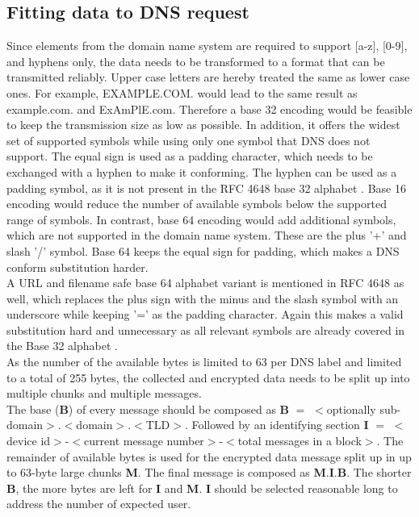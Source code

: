     \subsection{Fitting data to DNS request}
        \label{subsec:software_design:fitting}
        Since elements from the domain name system are required to support [a-z], [0-9], and hyphens only, the data needs to be transformed to a format that can be transmitted reliably. Upper case letters are hereby treated the same as lower case ones.
        For example, EXAMPLE.COM. would lead to the same result as example.com. and ExAmPlE.com.
        Therefore a base 32 encoding would be feasible to keep the transmission size as low as possible. In addition, it offers the widest set of supported symbols while using only one symbol that DNS does not support. The equal sign is used as a padding character, which needs to be exchanged with a hyphen to make it conforming. The hyphen can be used as a padding symbol, as it is not present in the RFC 4648 base 32 alphabet \cite{josefsson_simonjosefssonorg_base16_2006}. Base 16 encoding would reduce the number of available symbols below the supported range of symbols. In contrast, base 64 encoding would add additional symbols, which are not supported in the domain name system. These are the plus '+' and slash '/' symbol. Base 64 keeps the equal sign for padding, which makes a DNS conform substitution harder.\\
        A URL and filename safe base 64 alphabet variant is mentioned in RFC 4648 as well, which replaces the plus sign with the minus and the slash symbol with an underscore while keeping '=' as the padding character. Again this makes a valid substitution hard and unnecessary as all relevant symbols are already covered in the Base 32 alphabet \cite{josefsson_simonjosefssonorg_base16_2006}.\\
        
        As the number of the available bytes is limited to 63 per DNS label and limited to a total of 255 bytes, the collected and encrypted data needs to be split up into multiple chunks and multiple messages.\\
        The base (\textbf{B}) of every message should be composed as \textbf{B} $=$ $<$optionally sub-domain$>$.$<$domain$>$.$<$TLD$>$.
        Followed by an identifying section \textbf{I} $=$ $<$device id$>$-$<$current message number$>$-$<$total messages in a block$>$. 
        The remainder of available bytes is used for the encrypted data message split up in up to 63-byte large chunks \textbf{M}.
        The final message is composed as \textbf{M}.\textbf{I}.\textbf{B}. The shorter \textbf{B}, the more bytes are left for \textbf{I} and \textbf{M}. \textbf{I} should be selected reasonable long to address the number of expected user.\\
        
